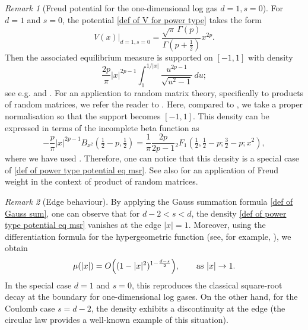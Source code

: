 \documentclass[10pt]{amsart}
\theoremstyle{plain}
\theoremstyle{remark}
\newtheorem{rem}{Remark}
\numberwithin{equation}{section}
\begin{document}
\begin{rem}[Freud potential for the one-dimensional log gas $d=1, s=0$]
For $d=1$ and $s=0$, the potential \eqref{def of V for power type} takes the form  
\begin{equation}
V(x) |_{d=1,s=0}= \frac{ \sqrt{\pi}\, \Gamma( p ) }{ \Gamma(p+\frac12) }  x^{2p}.
\end{equation}
Then the associated equilibrium measure is supported on $[-1,1]$ with density
\begin{equation}
\frac{ 2p }{ \pi  } |x|^{2p-1} \int_1^{ 1/|x| } \frac{ u^{2p-1} }{ \sqrt{u^2-1} }\,du ; 
\end{equation}
see e.g. \cite[Chapter IV.5]{ST97} and \cite[Eq.(1.9)]{CKM23}. 
For an application to random matrix theory, specifically to products of random matrices, we refer the reader to \cite{Fo14}.
Here, compared to \cite[Eq.(1.9)]{CKM23}, we take a proper normalisation so that the support becomes $[-1,1]$.
This density can be expressed in terms of the incomplete beta function as  
\begin{equation} 
-\frac{p}{\pi} |x|^{2p-1} B_{x^2}(\tfrac12-p,\tfrac12) = \frac{1}{\pi} \frac{2p}{2p-1} {}_2F_1( \tfrac12,\tfrac12-p; \tfrac32-p;x^2 ), 
\end{equation}
where we have used \cite[Eq.(8.17.7)]{NIST}. Therefore, one can notice that this density is a special case of \eqref{def of power type potential eq msr}.  
See also \cite{Fo14} for an application of Freud weight in the context of product of random matrices. 
\end{rem}

 



\begin{rem}[Edge behaviour]
By applying the Gauss summation formula \eqref{def of Gauss sum}, one can observe that for \( d-2 < s < d \), the density \eqref{def of power type potential eq msr} vanishes at the edge \( |x| = 1 \). 
Moreover, using the differentiation formula for the hypergeometric function 
(see, for example, \cite[Eq.(15.5.1)]{NIST}), we obtain
\begin{equation}
\mu(|x|)=O\Big( (1-|x|^2)^{ 1- \frac{d-s}{2} } \Big), \qquad \textup{as }|x| \to 1. 
\end{equation}
In the special case \( d=1 \) and \( s=0 \), this reproduces the classical 
square-root decay at the boundary for one-dimensional log gases. 
On the other hand, for the Coulomb case \( s = d-2 \), the density exhibits 
a discontinuity at the edge (the circular law provides a well-known example of this situation).
\end{rem}
\end{document}
